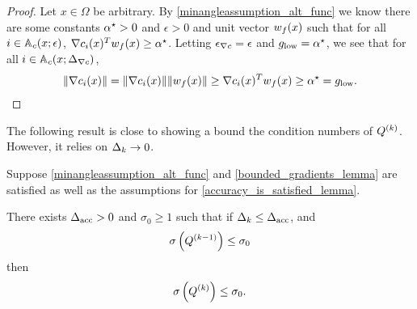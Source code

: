\begin{proof}
Let $x \in \Omega$ be arbitrary.
By \cref{minangleassumption_alt_func} we know there are some constants ${ \alpha^{\star} }>0$ and $\epsilon>0$ and unit vector ${w_f}(x)$
such that for all $i \in {\mathbb A_c}(x; \epsilon)$,
$\nabla c_i(x)^T{w_f}(x) \ge { \alpha^{\star} }$.
Letting ${\epsilon_{\nabla c}} = \epsilon$ and ${ g_{\textrm{low}} } = { \alpha^{\star} }$, we see that for all $i \in {\mathbb A_c}(x; {\Delta_{\nabla c}})$,
\begin{align*}
\|\nabla c_i(x)\| = \|\nabla c_i(x)\| \|{w_f}(x)\| \ge \nabla c_i(x)^T{w_f}(x) \ge { \alpha^{\star} } = { g_{\textrm{low}} }.
\end{align*}
\end{proof}

The following result is close to showing a bound the condition numbers of ${Q^{(k)}}$.
However, it relies on $\Delta_k \to 0$.
\begin{lemma}
Suppose \cref{minangleassumption_alt_func} and \cref{bounded_gradients_lemma} are satisfied as well as the assumptions for \cref{accuracy_is_satisfied_lemma}.

There exists ${\Delta_{\textrm{acc}}} > 0$ and $\sigma_0 \ge 1$ such that if $\Delta_k \le {\Delta_{\textrm{acc}}}$, and
\begin{align}
{\sigma} \left( Q^{(k-1)} \right) \le \sigma_0 \label{idk_alt_proof_statement1}
\end{align}
then 
\begin{align}
{\sigma} \left( {Q^{(k)}} \right) \le \sigma_0. \label{idk_alt_proof_statement2}
\end{align}
\end{lemma}


